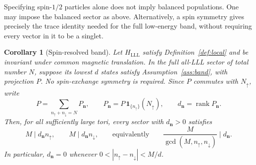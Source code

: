 \documentclass[11pt]{article}
\newtheorem{corollary}[theorem]{Corollary}
\theoremstyle{definition}
\theoremstyle{remark}
\newcommand{\one}{\mathbf 1}
\newcommand{\up}{\uparrow}
\newcommand{\dn}{\downarrow}
\newcommand{\abs}[1]{\left|#1\right|}
\begin{document}
Specifying spin-\(1/2\) particles alone does not imply balanced
populations.  One may impose the balanced sector as above.
Alternatively, a spin symmetry gives precisely the trace
identity needed for the full low-energy band, without requiring
every vector in it to be a singlet.

\begin{corollary}[Spin-resolved band]\label{cor:spinresolved}
Let \(H_{\mathrm{LLL}}\) satisfy Definition~\ref{def:local} and
be invariant under common magnetic translation.  In the full
all-LLL sector of total number \(N\), suppose its lowest \(d\)
states satisfy Assumption~\ref{ass:band}, with projection \(P\).
No spin-exchange symmetry is required.
Since \(P\) commutes with \(N_\up\),
write
\[
 P=\sum_{n_\up+n_\dn=N}P_{\bm n},\qquad
 P_{\bm n}=P\,\one_{\{n_\up\}}(N_\up),\qquad
 d_{\bm n}=\operatorname{rank}P_{\bm n}.
\]
Then, for all sufficiently large tori, every sector with
\(d_{\bm n}>0\) satisfies
\begin{equation}\label{eq:spinresolved}
 M\mid d_{\bm n}n_\up,\qquad M\mid d_{\bm n}n_\dn,
 \qquad\text{equivalently}\qquad
 \frac{M}{\gcd(M,n_\up,n_\dn)}\mid d_{\bm n}.
\end{equation}
In particular, \(d_{\bm n}=0\) whenever
\(0<\abs{n_\up-n_\dn}<M/d\).
\end{corollary}
\end{document}

